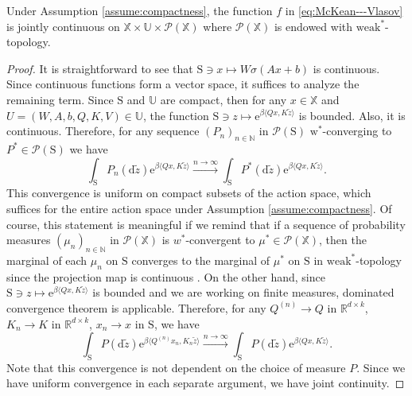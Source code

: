 \documentclass[11pt]{article}
\newcommand{\RR}{\mathbb{R}}
\newcommand{\NN}{\mathbb{N}}
\newcommand{\XX}{\mathbb{X}}
\newcommand{\UU}{\mathbb{U}}
\newcommand{\cP}{\mathcal{P}}
\newcommand{\inner}[2]{\langle#1, #2\rangle}
\newcommand{\e}{\mathrm{e}} %
\newcommand{\de}{\mathrm{d}} %
\begin{document}
\begin{proposition}\label{prop:continuity-of-mv}
    Under Assumption \ref{assume:compactness}, the function $f$ in \eqref{eq:McKean---Vlasov} is jointly continuous on $\XX\times\UU\times\cP(\XX)$ where $\cP(\XX)$ is endowed with $\text{weak}^*$-topology. 
\end{proposition}
\begin{proof}
    It is straightforward to see that $\mathrm{S}\ni x \mapsto W\sigma(Ax+b)$ is continuous. Since continuous functions form a vector space, it suffices to analyze the remaining term. Since $\mathrm{S}$ and $\UU$ are compact, then for any $x\in\XX$ and $U = (W, A, b, Q, K, V)\in\UU$, the function $\mathrm{S}\ni z\mapsto\e^{\beta\inner{Qx}{K\tilde{z}}}$ is bounded. Also, it is continuous. Therefore, for any sequence $(P_n)_{n\in\NN}$ in $\cP(\mathrm{S})$ $\mathrm{w}^*$-converging to $P^*\in\cP(\mathrm{S})$ we have
    \begin{equation*}
        \int_\mathrm{S} P_n(\de\tilde{z})\e^{\beta\inner{Qx}{K\tilde{z}}} \xrightarrow{n\to\infty}\int_\mathrm{S} P^*(\de\tilde{z})\e^{\beta\inner{Qx}{K\tilde{z}}}.
    \end{equation*}
    This convergence is uniform on compact subsets of the action space, which suffices for the entire action space under Assumption \ref{assume:compactness}. Of course, this statement is meaningful if we remind that if a sequence of probability measures $(\mu_n)_{n\in\NN}$ in $\cP(\XX) $ is $w^*$-convergent to $\mu^*\in\cP(\XX)$, then the marginal of each $\mu_n$ on $\mathrm{S}$ converges to the marginal of $\mu^*$ on $\mathrm{S}$ in $\text{weak}^*$-topology since the projection map is continuous \cite[Theorem 2.7]{billingsley2013convergence}. On the other hand, since $\mathrm{S}\ni z\mapsto\e^{\beta\inner{Qx}{K\tilde{z}}}$ is bounded and we are working on finite measures, dominated convergence theorem \cite[Theorem 2.4.5]{cohn2013measure} is applicable. Therefore, for any $Q^{(n)}\to Q$ in $\RR^{d\times k}$, $K_n\to K$ in $\RR^{d\times k}$, $x_n\to x$ in $\mathrm{S}$, we have
    \begin{equation*}
        \int_\mathrm{S}P(\de\tilde{z})\e^{\beta\inner{Q^{(n)}x_n}{K_n\tilde{z}}} \xrightarrow{n\to\infty}\int_\mathrm{S} P(\de\tilde{z})\e^{\beta\inner{Qx}{K\tilde{z}}}. 
    \end{equation*} 
    Note that this convergence is not dependent on the choice of measure $P$. Since we have uniform convergence in each separate argument, we have joint continuity.


\end{proof}
\end{document}

